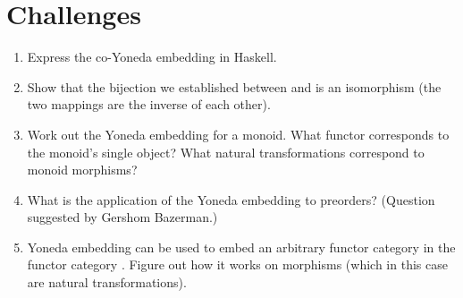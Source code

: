 \section{Challenges}\label{challenges}

\begin{enumerate}
\tightlist
\item
  Express the co-Yoneda embedding in Haskell.
\item
  Show that the bijection we established between  and
   is an isomorphism (the two mappings are the inverse of
  each other).
\item
  Work out the Yoneda embedding for a monoid. What functor corresponds
  to the monoid's single object? What natural transformations correspond
  to monoid morphisms?
\item
  What is the application of the  Yoneda embedding to
  preorders? (Question suggested by Gershom Bazerman.)
\item
  Yoneda embedding can be used to embed an arbitrary functor category
  \code{{[}C, D{]}} in the functor category
  \code{{[}{[}C, D{]}, Set{]}}. Figure out how it works on morphisms
  (which in this case are natural transformations).
\end{enumerate}